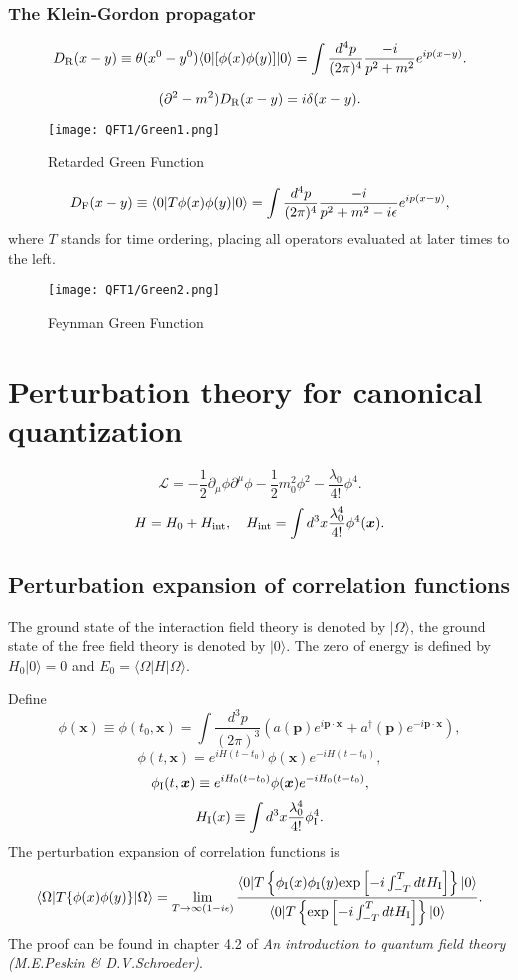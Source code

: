 \subsubsection{The Klein-Gordon propagator}
\[D_{\rm R}(x-y) \equiv \theta(x^0-y^0) \langle 0 | [\phi(x) \phi(y)] | 0 \rangle = \int \frac{d^4 p}{(2\pi)^4} \frac{-i}{p^2+m^2} e^{ip(x-y)}.\]

\[(\partial^2-m^2) D_{\rm R}(x-y) = i \delta(x-y).\]

\begin{figure}[!h]
\centering
\texttt{[image: QFT1/Green1.png]}
\caption{Retarded Green Function}
\end{figure}

\[D_{\rm F}(x-y) \equiv \langle 0 | T\phi(x) \phi(y) | 0 \rangle = \int \frac{d^4 p}{(2\pi)^4} \frac{-i}{p^2+m^2-i\epsilon} e^{ip(x-y)},\]
where $T$ stands for time ordering, placing all operators evaluated at later times to the left.
\begin{figure}[!h]
\centering
\texttt{[image: QFT1/Green2.png]}
\caption{Feynman Green Function}
\end{figure}

\section{Perturbation theory for canonical quantization}
\[\mathcal{L} = -\frac{1}{2}\partial_{\mu} \phi \partial^{\mu} \phi -\frac{1}{2}m_0^2 \phi^2 -\frac{\lambda_0}{4!}\phi^4.\]
\[H = H_0 + H_{\rm int} , \quad H_{\rm int} = \int d^3 x \frac{\lambda_0^4}{4!} \phi^4 (\bm{x}).\]

\subsection{Perturbation expansion of correlation functions}
\begin{note}
The ground state of the interaction field theory is denoted by $| \Omega \rangle$, the ground state of the free field theory is denoted by $| 0 \rangle$. The zero of energy is defined by $H_0 | 0 \rangle =0$ and $E_0 = \langle \Omega | H | \Omega \rangle$.
\end{note}
\noindent
Define
\[\phi(\bm{x}) \equiv \phi(t_0,\bm{x}) = \int \frac{d^3p}{(2\pi)^3}( a(\bm{p})e^{i\bm{p}\cdot\bm{x}} + a^{\dagger}(\bm{p})e^{-i\bm{p}\cdot\bm{x}}),\]
\[\phi(t,\bm{x}) = e^{iH(t-t_0)} \phi(\bm{x}) e^{-iH(t-t_0)},\]
\[\phi_{\rm I}(t,\bm{x}) \equiv e^{iH_0(t-t_0)} \phi(\bm{x}) e^{-iH_0(t-t_0)},\]
\[H_{\rm I}(x) \equiv \int d^3x \frac{\lambda_0^4}{4!} \phi_{\rm I}^4.\]
The perturbation expansion of correlation functions is
\[\langle \Omega | T \{ \phi(x) \phi(y) \} | \Omega \rangle = \lim_{T \to \infty(1-i\epsilon)} \frac{\langle 0 | T \left\{ \phi_{\rm I}(x) \phi_{\rm I}(y) \mathrm{exp} \left[ -i \int_{-T}^{T} dt H_{\rm I} \right]\right\} | 0 \rangle}{\langle 0 | T \left\{ \mathrm{exp} \left[ -i \int_{-T}^{T} dt H_{\rm I} \right]\right\} | 0 \rangle}.\]
The proof can be found in chapter 4.2 of \emph{An introduction to quantum field theory (M.E.Peskin \& D.V.Schroeder)}.
\\

